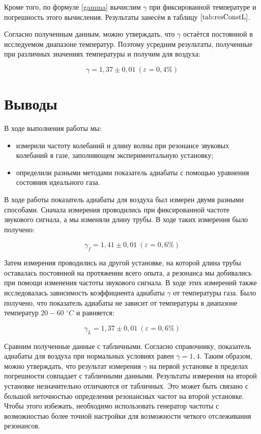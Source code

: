 \documentclass[a4paper,12pt]{article}
\theoremstyle{definition}
\begin{document}
	Кроме того, по формуле \eqref{gamma} вычислим $ \gamma $ при фиксированной температуре и погрешность этого вычисления. Результаты занесём в таблицу $ \ref{tab:resConstL} $. 
	
	Согласно полученным данным, можно утверждать, что $ \gamma $ остаётся постоянной в исследуемом диапазоне температур. Поэтому усредним результаты, полученные при различных значениях температуры и получим для воздуха:
	
	\[ \gamma = 1,37 \pm 0,01 \ (\varepsilon=0,4\%) \]
	
	\section{Выводы}
	
	В ходе выполнения работы мы:
	
	\begin{itemize}
		\item измерили частоту колебаний и длину волны при резонансе звуковых колебаний в газе, заполняющем экспериментальную установку;
		\item определили разными методами показатель адиабаты с помощью уравнения состояния идеального газа.
	\end{itemize}
	
	В ходе работы показатель адиабаты для воздуха был измерен двумя разными способами. Сначала измерения проводились при фиксированной частоте звукового сигнала, а мы изменяли длину трубы. В ходе таких измерения было получено:
	
	\[ \gamma_f = 1,41 \pm 0,01 \ (\varepsilon=0,6\%) \]
	
	Затем измерения проводились на другой установке, на которой длина трубы оставалась постоянной на протяжении всего опыта, а резонанса мы добивались при помощи изменения частоты звукового сигнала. В ходе этих измерений также исследовалась зависимость коэффициента адиабаты $ \gamma $ от температуры газа. Было получено, что показатель адиабаты не зависит от температуры в диапазоне температур $ 20-60 $ $ ^\circ C $ и равняется:
	
	\[ \gamma_L = 1,37 \pm 0,01 \ (\varepsilon=0,6\%) \]
	
	Сравним полученные данные с табличными. Согласно справочнику, показатель адиабаты для воздуха при нормальных условиях равен $ \gamma = 1,4 $. Таким образом, можно утверждать, что результат измерения $ \gamma $ на первой установке в пределах погрешности совпадает с табличными данными. Результаты измерения на второй установке незначительно отличаются от табличных. Это может быть связано с большой неточностью определения резонансных частот на второй установке. Чтобы этого избежать, необходимо использовать генератор частоты с возможностью более точной настройки для возможности четкого отслеживания резонансов.
	
\end{document}
